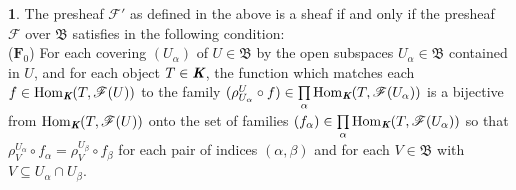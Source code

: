 \documentclass[12pt]{amsart}
\newcommand{\Hom}{\operatorname{Hom}}
\theoremstyle{definition}
\newtheorem{bk}[proposition]{}
\begin{document}
\begin{bk}\label{I: 3.2.2} The presheaf $\mathscr{F}'$ as defined in the above is a sheaf if and only if the presheaf $\mathscr{F}$ over $\mathfrak{B}$ satisfies in the following condition:\\

($\textbf{F}_{0}$) For each covering $(U_{\alpha})$ of $U\in\mathfrak{B}$ by the open subspaces $U_{\alpha}\in\mathfrak{B}$ contained in $U$, and for each object $T\in\emph{\textbf{K}}$, the function which matches each $f\in\Hom_{\emph{\textbf{K}}}(T, \mathscr{F}(U))$ to the family $(\rho_{U_{\alpha}}^{U}\circ f)\in\prod\limits_{\alpha}\Hom_{\emph{\textbf{K}}}(T, \mathscr{F}(U_{\alpha}))$ is a bijective from $\Hom_{\emph{\textbf{K}}}(T, \mathscr{F}(U))$ onto the set of families $(f_{\alpha})\in\prod\limits_{\alpha}\Hom_{\emph{\textbf{K}}}(T, \mathscr{F}(U_{\alpha}))$ so that $\rho_{V}^{U_{\alpha}}\circ f_{\alpha}=\rho_{V}^{U_{\beta}}\circ f_{\beta}$ for each pair of indices $(\alpha, \beta)$ and for each $V\in\mathfrak{B}$ with $V\subseteq U_{\alpha}\cap U_{\beta}$.\\


\end{bk}
\end{document}
